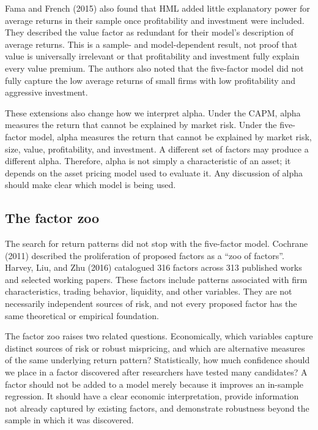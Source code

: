 Fama and French (2015) also found that HML added little explanatory power for average returns in their sample once profitability and investment were included. They described the value factor as redundant for their model's description of average returns. This is a sample- and model-dependent result, not proof that value is universally irrelevant or that profitability and investment fully explain every value premium. The authors also noted that the five-factor model did not fully capture the low average returns of small firms with low profitability and aggressive investment.

These extensions also change how we interpret alpha. Under the CAPM, alpha measures the return that cannot be explained by market risk.
Under the five-factor model, alpha measures the return that cannot be explained by market risk, size, value, profitability, and investment.
A different set of factors may produce a different alpha. Therefore, alpha is not simply a characteristic of an asset; it depends on the
asset pricing model used to evaluate it. Any discussion of alpha should make clear which model is being used.

\subsection{The factor zoo}
\label{sec:03-zoo}
The search for return patterns did not stop with the five-factor model. Cochrane (2011) described the proliferation of proposed factors as a ``zoo of factors''. Harvey, Liu, and Zhu (2016) catalogued 316 factors across 313 published works and selected working papers. These factors include patterns associated with firm characteristics, trading behavior, liquidity, and other variables. They are not necessarily independent sources of risk, and not every proposed factor has the same theoretical or empirical foundation.

The factor zoo raises two related questions. Economically, which variables capture distinct sources of risk or robust mispricing, and which are alternative measures of the same underlying return pattern? Statistically, how much confidence should we place in a factor discovered after researchers have tested many candidates? A factor should not be added to a model merely because it improves an in-sample regression. It should have a clear economic interpretation, provide information not already captured by existing factors, and demonstrate robustness beyond the sample in which it was discovered.

